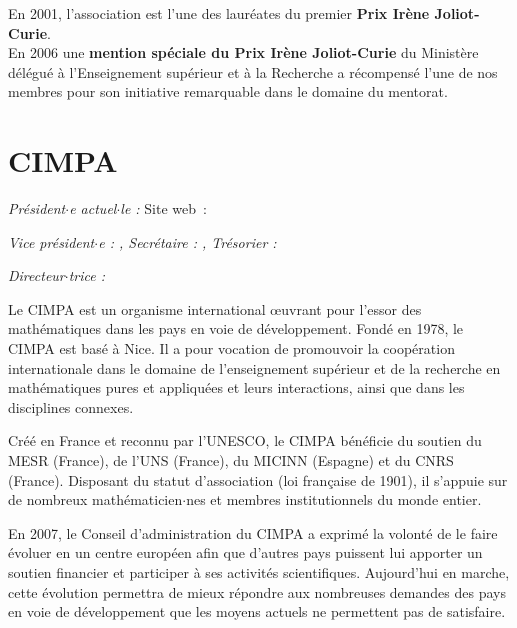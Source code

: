 En 2001, l'association est l'une des laur\'eates du premier \textbf{Prix Ir\`ene Joliot-Curie}. \\
En 2006 une \textbf{mention sp\'eciale du Prix Ir\`ene Joliot-Curie} du Minist\`ere d\'el\'egu\'e \`a l'Enseignement sup\'erieur et \`a la Recherche a r\'ecompens\'e l'une de nos membres pour son initiative remarquable dans le domaine du mentorat. \\






\section{CIMPA}

\emph{Pr\'esident$\cdot$e actuel$\cdot$le : }\hfill Site web~: 

\emph{Vice pr\'esident$\cdot$e : , Secr\'etaire : ,
Tr\'esorier : }

\emph{Directeur$\cdot$trice : }
\smallskip



Le CIMPA est un organisme international
\oe uvrant pour l'essor des
math\'ematiques dans les pays en
voie de d\'eveloppement.
Fond\'e en 1978, le CIMPA est bas\'e
\`a Nice. Il a pour vocation de promouvoir
la coop\'eration internationale
dans le domaine de l'enseignement
sup\'erieur et de la recherche en math\'ematiques
pures et appliqu\'ees et
leurs interactions, ainsi que dans les
disciplines connexes.

Cr\'e\'e en France et reconnu par
l'UNESCO, le CIMPA b\'en\'eficie du
soutien du MESR (France), de l'UNS
(France), du MICINN (Espagne) et
du CNRS (France). Disposant du
statut d'association (loi fran\c caise de
1901), il s'appuie sur de nombreux
math\'ematicien$\cdot$nes et membres institutionnels
du monde entier.

En 2007, le Conseil d'administration
du CIMPA a exprim\'e la volont\'e
de le faire \'evoluer en un centre
europ\'een afin que d'autres pays
puissent lui apporter un soutien
financier et participer \`a ses activit\'es
scientifiques. Aujourd'hui en
marche, cette \'evolution permettra
de mieux r\'epondre aux nombreuses
demandes des pays en voie de d\'eveloppement
que les moyens actuels
ne permettent pas de satisfaire.







